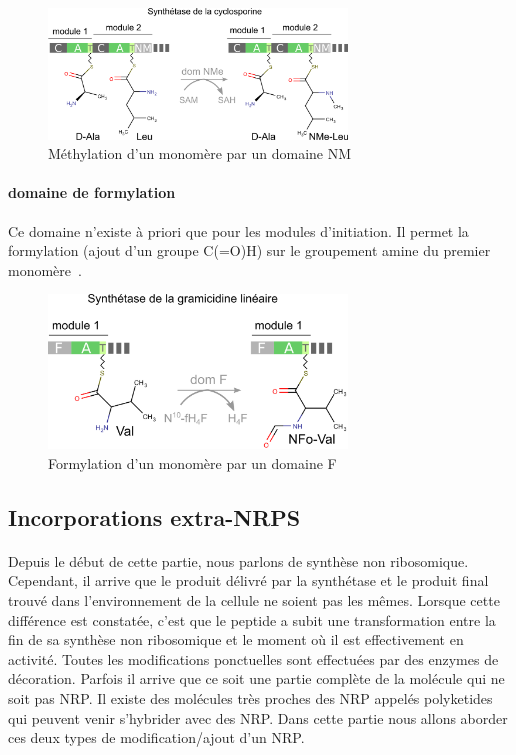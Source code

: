 \documentclass[12pt,french,twoside]{report}
\begin{document}
\begin{figure}[h!]
  \begin{center}
    \includegraphics[width=300px]{Figures/bio/Intro/domaineNMe-cyclosporine.png}
    \caption{\label{domaine_NMe}Méthylation d'un monomère par un domaine NM}
  \end{center}
\end{figure}

\paragraph{domaine de formylation}

Ce domaine n'existe à priori que pour les modules d'initiation.
Il permet la formylation (ajout d'un groupe C(=O)H) sur le groupement amine du premier monomère~\cite{schonafinger_amide_2007}.

\begin{figure}[h!]
  \begin{center}
    \includegraphics[width=300px]{Figures/bio/Intro/domaineF-gramicidine.png}
    \caption{\label{domaine_F}Formylation d'un monomère par un domaine F}
  \end{center}
\end{figure}


\subsection{Incorporations extra-NRPS}

\paragraph{}Depuis le début de cette partie, nous parlons de synthèse non ribosomique.
Cependant, il arrive que le produit délivré par la synthétase et le produit final trouvé dans l'environnement de la cellule ne soient pas les mêmes.
Lorsque cette différence est constatée, c'est que le peptide a subit une transformation entre la fin de sa synthèse non ribosomique et le moment où il est effectivement en activité.
Toutes les modifications ponctuelles sont effectuées par des enzymes de décoration.
Parfois il arrive que ce soit une partie complète de la molécule qui ne soit pas NRP.
Il existe des molécules très proches des NRP appelés polyketides qui peuvent venir s'hybrider avec des NRP.
Dans cette partie nous allons aborder ces deux types de modification/ajout d'un NRP.
\end{document}
